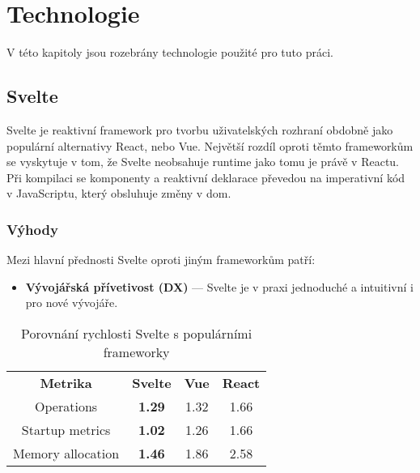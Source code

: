 \chapter{Technologie}

V této kapitoly jsou rozebrány technologie použité pro tuto práci.

\section{Svelte}\label{sec:Svelte}

Svelte je reaktivní framework pro tvorbu uživatelských rozhraní obdobně jako populární alternativy React, nebo Vue.
Největší rozdíl oproti těmto frameworkům se vyskytuje v tom, že Svelte neobsahuje runtime jako tomu je právě v Reactu.
Při kompilaci se komponenty a reaktivní deklarace převedou na imperativní kód v JavaScriptu, který obsluhuje změny v \gls{dom}.

\subsection{Výhody}

Mezi hlavní přednosti Svelte oproti jiným frameworkům patří:

\begin{itemize}
    \item \textbf{Vývojářská přívetivost (DX)} --- Svelte je v praxi jednoduché a intuitivní i pro nové vývojáře.
\end{itemize}

\begin{table}[ht]
    \begin{ctucolortab}
        \begin{tabular}{c|c|c|c}
            \bfseries Metrika & \bfseries Svelte & \bfseries Vue & \bfseries React \\\Midrule{}
            Operations        & \textbf{1.29}    & 1.32          & 1.66            \\
            Startup metrics   & \textbf{1.02}    & 1.26          & 1.66            \\
            Memory allocation & \textbf{1.46}    & 1.86          & 2.58
        \end{tabular}
    \end{ctucolortab}
    \caption{Porovnání rychlosti Svelte s populárními frameworky}
    \label{tab:foobar}
\end{table}

\clearpage

